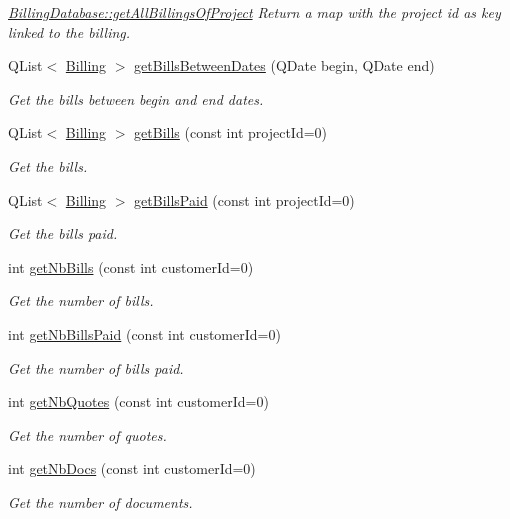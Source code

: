 \begin{DoxyCompactItemize}
\begin{DoxyCompactList}\small\item\em \hyperlink{classDatabases_1_1BillingDatabase_a44c3e09fbb7d540579f4cceae4d6901f}{Billing\-Database\-::get\-All\-Billings\-Of\-Project} Return a map with the project id as key linked to the billing. \end{DoxyCompactList}\item 
Q\-List$<$ \hyperlink{classModels_1_1Billing}{Billing} $>$ \hyperlink{classDatabases_1_1BillingDatabase_ae4300e4e8f5587facf0fd370b4178a79}{get\-Bills\-Between\-Dates} (Q\-Date begin, Q\-Date end)
\begin{DoxyCompactList}\small\item\em Get the bills between {\itshape begin} and {\itshape end} dates. \end{DoxyCompactList}\item 
Q\-List$<$ \hyperlink{classModels_1_1Billing}{Billing} $>$ \hyperlink{classDatabases_1_1BillingDatabase_af94468bf6fef5f076bad1d6df4fae887}{get\-Bills} (const int project\-Id=0)
\begin{DoxyCompactList}\small\item\em Get the bills. \end{DoxyCompactList}\item 
Q\-List$<$ \hyperlink{classModels_1_1Billing}{Billing} $>$ \hyperlink{classDatabases_1_1BillingDatabase_a86491627f6a9d610e62832fd6cbdc0bb}{get\-Bills\-Paid} (const int project\-Id=0)
\begin{DoxyCompactList}\small\item\em Get the bills paid. \end{DoxyCompactList}\item 
int \hyperlink{classDatabases_1_1BillingDatabase_af173470dd295561e6b1e667cfbba31a6}{get\-Nb\-Bills} (const int customer\-Id=0)
\begin{DoxyCompactList}\small\item\em Get the number of bills. \end{DoxyCompactList}\item 
int \hyperlink{classDatabases_1_1BillingDatabase_a5a0b207606dd48fcc31d5b503146bbfa}{get\-Nb\-Bills\-Paid} (const int customer\-Id=0)
\begin{DoxyCompactList}\small\item\em Get the number of bills paid. \end{DoxyCompactList}\item 
int \hyperlink{classDatabases_1_1BillingDatabase_a68ba76c50066be61efbe71e0be24677c}{get\-Nb\-Quotes} (const int customer\-Id=0)
\begin{DoxyCompactList}\small\item\em Get the number of quotes. \end{DoxyCompactList}\item 
int \hyperlink{classDatabases_1_1BillingDatabase_a61b223cf1f0bef5421e6c39fd4bbe827}{get\-Nb\-Docs} (const int customer\-Id=0)
\begin{DoxyCompactList}\small\item\em Get the number of documents. \end{DoxyCompactList}\end{DoxyCompactItemize}
